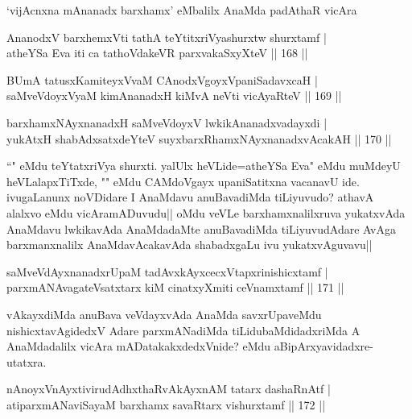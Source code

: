 \begin{center}%
`vijAcnxna mAnanadx barxhamx' eMbalilx AnaMda padAthaR vicAra
\end{center}

\begin{shl}
AnanodxV barxhemxVti tathA teYtitxriVyashurxtw shurxtamf |\\
atheYSa Eva iti ca tathoVdakeVR parxvakaSxyXteV \hfill || 168 ||
\end{shl}

\begin{shl}
BUmA tatusxKamiteyxVvaM CAnodxVgoyxVpaniSadavxcaH |\\
saMveVdoyxV\s yaM kimAnanadxH kiMvA neVti vicAyaRteV \hfill || 169 ||
\end{shl}

\begin{shl}
barxhamxNAyxnanadxH saMveVdoyxV lwkikAnanadxvadayxdi |\\
yukAtxH shabAdxsatxdeYteV suyxbarxRhamxNAyxnanadxvAcakAH \hfill || 170 ||
\end{shl}

\begin{artha}
``\stext " eMdu teYtatxriVya shurxti. yalUlx heVLide=atheYSa Eva" eMdu muMdeyU heVLalapxTiTxde, "\stext " eMdu CAMdoVgayx upaniSatitxna vacanavU ide. ivugaLanunx noVDidare I AnaMdavu anuBavadiMda tiLiyuvudo? athavA alalxvo eMdu vicAramADuvudu|| oMdu veVLe barxhamxnalilxruva yukatxvAda AnaMdavu lwkikavAda AnaMdadaMte anuBavadiMda tiLiyuvudAdare AvAga barxmanxnalilx AnaMdavAcakavAda shabadxgaLu ivu yukatxvAguvavu||
\end{artha}


\begin{shl}
saMveVdAyxnanadxrUpaM tadAvxkAyxcecxVtapxrinishicxtamf |\\
parxmANAvagateVsatxtarx kiM cinatxyXmiti ceVnamxtamf \hfill || 171 ||
\end{shl}

\begin{artha}
vAkayxdiMda anuBava veVdayxvAda AnaMda savxrUpaveMdu nishicxtavAgidedxV Adare parxmANadiMda tiLidubaMdidadxriMda A AnaMdadalilx vicAra mADatakakxdedxVnide? eMdu aBipArxyavidadxre- utatxra.
\end{artha}%

\begin{shl}
nAnoyxVnAyxtivirudAdhxthaRvAkAyxnAM tatarx dashaRnAtf |\\
atiparxmANaviSayaM barxhamx savaRtarx vishurxtamf \hfill || 172 ||
\end{shl}


